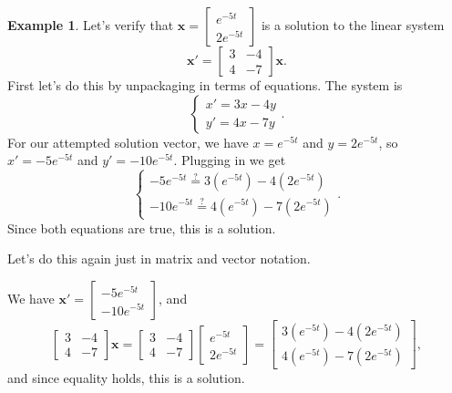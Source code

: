\documentclass[12pt]{amsart}
\numberwithin{equation}{section}
\theoremstyle{plain} %
\theoremstyle{definition}
\newtheorem{ex}[equation]{Example}
\theoremstyle{remark}
\begin{document}
\begin{ex} Let's verify that $\mathbf{x} = \begin{bmatrix} e^{-5t} \\ 2 e^{-5t} \end{bmatrix}$ is a solution to the linear system
\[ \mathbf{x'} = \begin{bmatrix} 3 & -4 \\ 4 & -7 \end{bmatrix} \mathbf{x}.\]
First let's do this by unpackaging in terms of equations. The system is
\[ \begin{cases} x' = 3x - 4y \\ y' =4x-7y  \end{cases}.\]
For our attempted solution vector, we have $x=  e^{-5t}$ and $y=2 e^{-5t}$, so $x' = -5 e^{-5t}$ and $y'=-10 e^{-5t}$. Plugging in we get
\[ \begin{cases} -5 e^{-5t} \stackrel{?}{=} 3 (e^{-5t}) - 4 (2 e^{-5t})  \\ -10 e^{-5t} \stackrel{?}{=}  4 (e^{-5t}) - 7 (2 e^{-5t}) \end{cases}.\]
Since both equations are true, this is a solution.

Let's do this again just in matrix and vector notation.
 
We have $\mathbf{x'} =  \begin{bmatrix} -5 e^{-5t} \\ -10 e^{-5t} \end{bmatrix}$, and 
\[ \begin{bmatrix} 3 & -4 \\ 4 & -7 \end{bmatrix} \mathbf{x} = \begin{bmatrix} 3 & -4 \\ 4 & -7 \end{bmatrix}  \begin{bmatrix} e^{-5t} \\ 2 e^{-5t} \end{bmatrix} = \begin{bmatrix} 3 (e^{-5t}) - 4 (2 e^{-5t}) \\ 4 (e^{-5t}) - 7 (2 e^{-5t}) \end{bmatrix} ,\]
and since equality holds, this is a solution.
\end{ex}
\end{document}
